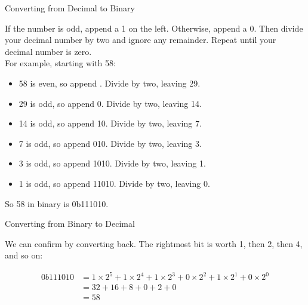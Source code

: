 \begin{frame}{Converting from Decimal to Binary}

    If the number is odd, append a 1 on the left. Otherwise, append a 0. Then
    divide your decimal number by two and ignore any remainder. Repeat until your
    decimal number is zero. \\

    For example, starting with 58:

    \begin{itemize}
        \item 58 is even, so append . Divide by two, leaving 29.
        \item 29 is odd, so append 0. Divide by two, leaving 14.
        \item 14 is odd, so append 10. Divide by two, leaving 7.
        \item 7 is odd, so append 010. Divide by two, leaving 3.
        \item 3 is odd, so append 1010. Divide by two, leaving 1.
        \item 1 is odd, so append 11010. Divide by two, leaving 0.
    \end{itemize}

    So 58 in binary is 0b111010.

\end{frame}

\begin{frame}{Converting from Binary to Decimal}

    We can confirm by converting back. The rightmost bit is worth 1, then 2, then
    4, and so on:

    \begin{align*}
        0b111010 & =
        1 \! \times \! 2^5 +
        1 \! \times \! 2^4 +
        1 \! \times \! 2^3 +
        0 \! \times \! 2^2 +
        1 \! \times \! 2^1 +
        0 \! \times \! 2^0                    \\
                 & = 32 + 16  + 8 + 0 + 2 + 0 \\
                 & = 58
    \end{align*}

\end{frame}

